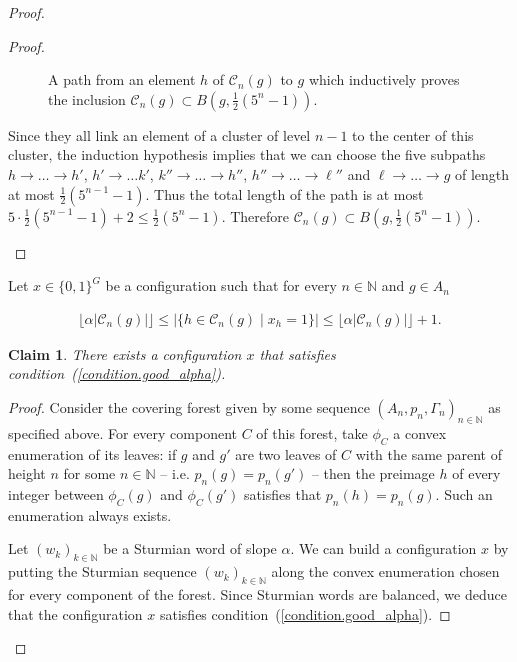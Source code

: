 \documentclass[letterpaper]{article}
\theoremstyle{plain}
\newtheorem{claim}{Claim}[section]
\def\NN{\mathbb{N}}
\def\CC{\mathcal{C}}
\begin{document}
\begin{proof}
\begin{proof}
\begin{itemize}
				\begin{figure}[!ht]
					\centering
					
					\caption{A path from an element $h$ of $\CC_n(g)$ to $g$ which inductively proves the inclusion $\CC_{n}(g) \subset B(g,\frac{1}{2}(5^{n}-1))$.}
					\label{figure.upper_bound_cluster}
				\end{figure}
				
				
				Since they all link an element of a cluster of level $n-1$ to the center of this cluster, the induction hypothesis implies that we can choose the five subpaths $h \to \dots \to h'$, $h'\to \dots k'$, $k'' \to \dots \to h''$, $h''\to \dots \to \ell''$ and $\ell \to \dots \to g$ of length at most $\frac{1}{2}(5^{n-1}-1)$. Thus the total length of the path is at most $5\cdot\frac{1}{2}(5^{n-1}-1)+2\leq\frac{1}{2}(5^{n}-1)$. Therefore $\CC_{n}(g) \subset B(g,\frac{1}{2}(5^{n}-1))$.
				
			\end{itemize}
		\end{proof}
		
		Let $x \in \{0,1\}^G$ be a configuration such that for every $n \in \NN$ and $g \in A_n$
		
		\begin{align}
			\lfloor \alpha|\CC_{n}(g)| \rfloor \leq |\{h \in \CC_n(g) \mid x_h = 1\}| \leq \lfloor \alpha|\CC_{n}(g)| \rfloor +1 
			\label{condition.good_alpha}.
		\end{align}
		
		\begin{claim}\label{claim.exists_config_condition}
			There exists a configuration $x$ that satisfies condition~(\ref{condition.good_alpha}).
		\end{claim}
		
		\begin{proof}
			Consider the covering forest given by some sequence $(A_n,p_n,\Gamma_n)_{n \in \NN}$ as specified above. For every component $C$ of this forest, take $\phi_C$ a convex enumeration of its leaves: if $g$ and $g'$ are two leaves of $C$ with the same parent of height $n$ for some $n\in\NN$ -- i.e. $p_n(g)=p_n(g')$ -- then the preimage $h$ of every integer between $\phi_C(g)$ and $\phi_C(g')$ satisfies that $p_n(h)=p_n(g)$. Such an enumeration always exists.
			
			Let $(w_k)_{k \in \NN}$ be a Sturmian word of slope $\alpha$. We can build a configuration $x$ by putting the Sturmian sequence $(w_k)_{k \in \NN}$ along the convex enumeration chosen for every component of the forest. Since Sturmian words are balanced, we deduce that the configuration $x$ satisfies condition~(\ref{condition.good_alpha}). \end{proof}
		

\end{proof}
\end{document}
